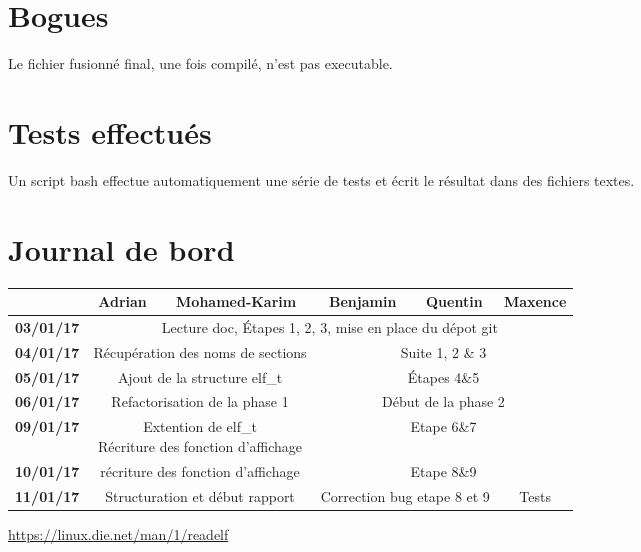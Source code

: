 \documentclass[10pt,twoside]{article}   %
\begin{document}
\section{Bogues}
	Le fichier fusionné final, une fois compilé, n'est pas executable.


\section{Tests effectués}
	Un script bash effectue automatiquement une série de tests et écrit le résultat dans des fichiers textes.

\section{Journal de bord}

	\tabcolsep=0.11cm
	\begin{tabular}{| c || *{4}{c|} c |}
		\hline
		& Adrian & Mohamed-Karim & Benjamin & Quentin & Maxence \\
		\hline
		\bf{03/01/17} & \multicolumn{5}{c|}{Lecture doc, Étapes 1, 2, 3, mise en place du dépot git}\\
		\hline
		\bf{04/01/17} & \multicolumn{2}{c|}{Récupération des noms de sections} & \multicolumn{3}{c|}{Suite 1, 2 \& 3} \\
		\hline
		\bf{05/01/17} & \multicolumn{2}{c|}{Ajout de la structure elf\_t} & \multicolumn{3}{c|}{Étapes 4\&5} \\
		\hline
		\bf{06/01/17} & \multicolumn{2}{c|}{Refactorisation de la phase 1} & \multicolumn{3}{c|}{Début de la phase 2} \\
		\hline
		\bf{09/01/17} & \multicolumn{2}{c|}{\parbox[t]{5cm}{Extention de elf\_t\\Récriture des fonction d'affichage}} & \multicolumn{3}{c|}{Etape 6\&7} \\
		\hline
		\bf{10/01/17} & \multicolumn{2}{c|}{récriture des fonction d'affichage} & \multicolumn{3}{c|}{Etape 8\&9} \\
		\hline
		\bf{11/01/17} & \multicolumn{2}{c|}{Structuration et début rapport} & \multicolumn{2}{c|}{Correction bug etape 8 et 9} & Tests\\
		\hline
	\end{tabular}

\begin{thebibliography}{9}

\url{https://linux.die.net/man/1/readelf}


\end{thebibliography}
\end{document}
